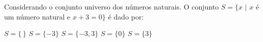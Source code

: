 Considerando o conjunto universo dos números naturais. O conjunto $S=\{x\,\,|\,\,x$ é um número natural e $x+3=0\}$ é dado por:

$S=\{\,\}$
$S=\{-3\}$
$S=\{-3,3\}$
$S=\{0\}$
$S=\{3\}$



